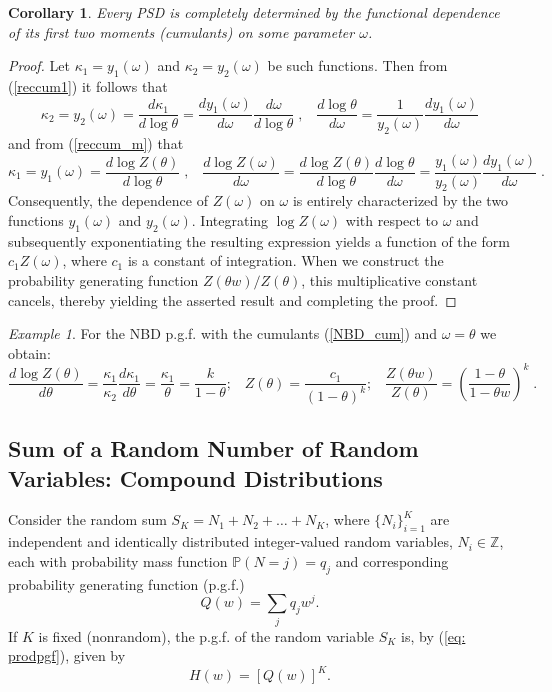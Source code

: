 \documentclass[a4paper,12pt]{amsart}
\newtheorem{Corollary}{Corollary}[section]
\theoremstyle{definition}
\theoremstyle{remark}
\newtheorem{Example}{Example}[section]
\begin{document}
\begin{Corollary}\label{Khatri} {\rm \cite{Khatri1959}} 
Every PSD is completely determined by the functional dependence of its first two moments (cumulants) on some parameter $\omega$. 
\end{Corollary}
\begin{proof}
Let $\kappa_{1}\!=\!y_{1}(\omega)$ and $\kappa_{2}\!=\!y_{2}(\omega)$ be such functions. Then from (\ref{reccum1}) it follows that
\[
\kappa_2=y_2(\omega)=\frac{d\kappa_1}{d\log \theta}= 
\frac{d y_1(\omega)}{d\omega}\frac{d\omega}{d\log\theta}\;,\;\;\; 
\frac{d\log \theta}{d \omega}=\frac{1}{y_2(\omega)}\frac{dy_1(\omega)}{d\omega}
\]
and from (\ref{reccum_m}) that
\[
\kappa_1=y_1(\omega)=\frac{d\log Z(\theta)}{d \log \theta}\;,\;\;\;
\frac{d \log Z(\omega)}{d\omega}=\frac{d\log Z(\theta)}{d\log \theta}\frac{d\log \theta}{d \omega}=
\frac{y_1(\omega)}{y_2(\omega)}\frac{d y_1(\omega)}{d\omega}\;.
\]
Consequently, the dependence of \(Z(\omega)\) on \(\omega\) is entirely characterized by the two functions \(y_{1}(\omega)\) and \(y_{2}(\omega)\). Integrating \(\log Z(\omega)\) with respect to \(\omega\) and subsequently exponentiating the resulting expression yields a function of the form \(c_{1} Z(\omega)\), where \(c_{1}\) is a constant of integration. When we construct the probability generating function \(Z(\theta w)/Z(\theta)\), this multiplicative constant cancels, thereby yielding the asserted result and completing the proof.\end{proof}
\begin{Example}
    For the NBD p.g.f. with the cumulants (\ref{NBD_cum}) and $\omega=\theta$ we obtain:
    \[
    \frac{d \log Z(\theta)}{d\theta}=\frac{\kappa_1}{\kappa_2}\frac{d \kappa_1}{d\theta}=
    \frac{\kappa_1}{\theta}=\frac{k}{1-\theta};\;\;\;  Z(\theta)=\frac{c_1}{(1-\theta)^k};\;\;\;\frac{Z(\theta w)}{Z(\theta)}=\left(\frac{1-\theta}{1-\theta w}\right)^k\;.
    \]
\end{Example}
\subsection{Sum of a Random Number of Random Variables: Compound Distributions}
Consider the random sum \(S_K = N_1 + N_2 + \ldots + N_K\), where \(\{N_i\}_{i=1}^K\) are independent and identically distributed integer-valued random variables, \(N_i \in \mathbb{Z}\), each with probability mass function \(\mathbb{P}(N=j)=q_j\) and corresponding probability generating function (p.g.f.) 
\[
Q(w) = \sum_{j} q_j w^j.
\]
If \(K\) is fixed (nonrandom), the p.g.f. of the random variable \(S_K\) is, by (\ref{eq: prodpgf}), given by
\[
H(w) = [Q(w)]^K.
\]
\end{document}
